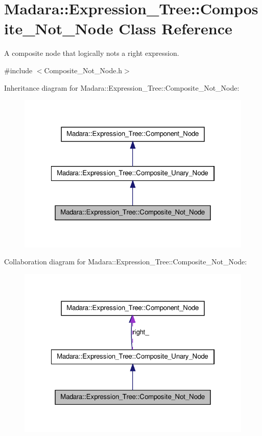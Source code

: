 \hypertarget{classMadara_1_1Expression__Tree_1_1Composite__Not__Node}{
\section{Madara::Expression\_\-Tree::Composite\_\-Not\_\-Node Class Reference}
\label{d8/df8/classMadara_1_1Expression__Tree_1_1Composite__Not__Node}
}


A composite node that logically nots a right expression.  




{\ttfamily \#include $<$Composite\_\-Not\_\-Node.h$>$}



Inheritance diagram for Madara::Expression\_\-Tree::Composite\_\-Not\_\-Node:
\nopagebreak
\begin{figure}[H]
\begin{center}
\leavevmode
\includegraphics[width=322pt]{d0/dde/classMadara_1_1Expression__Tree_1_1Composite__Not__Node__inherit__graph}
\end{center}
\end{figure}


Collaboration diagram for Madara::Expression\_\-Tree::Composite\_\-Not\_\-Node:
\nopagebreak
\begin{figure}[H]
\begin{center}
\leavevmode
\includegraphics[width=322pt]{db/df1/classMadara_1_1Expression__Tree_1_1Composite__Not__Node__coll__graph}
\end{center}
\end{figure}
